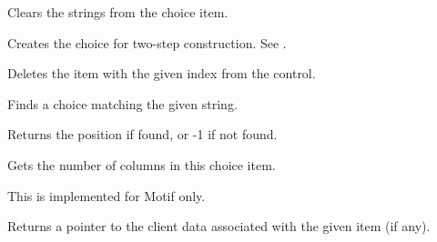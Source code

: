 \label{wxchoiceclear}


Clears the strings from the choice item.

\label{wxchoicecreate}


Creates the choice for two-step construction. See .

\label{wxchoicedelete}


Deletes the item with the given index from the control.



\label{wxchoicefindstring}


Finds a choice matching the given string.




Returns the position if found, or -1 if not found.

\label{wxchoicegetcolumns}


Gets the number of columns in this choice item.


This is implemented for Motif only.

\label{wxchoicegetclientdata}


Returns a pointer to the client data associated with the given item (if any).



